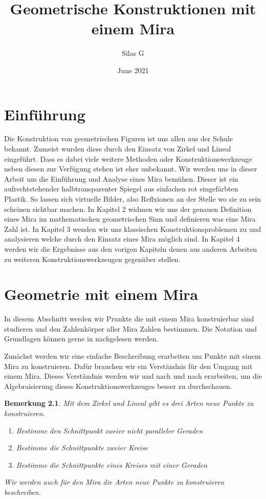 \documentclass{scrbook}
\newtheorem{remark}{Bemerkung}
\begin{document}
\frontmatter
\begin{titlepage}
    \title{Geometrische Konstruktionen mit einem Mira}
    \author{Silas G}
    \date{June 2021}
    \maketitle
\end{titlepage}
\tableofcontents

\mainmatter
\chapter{Einführung}

Die Konstruktion von geometrischen Figuren ist uns allen aus der Schule bekannt.
Zumeist wurden diese durch den Einsatz von Zirkel und Lineal eingeführt.
Dass es dabei viele weitere Methoden oder Konstruktionswerkzeuge neben diesen zur Verfügung stehen ist eher unbekannt.
Wir werden uns in dieser Arbeit um die Einführung und Analyse eines Mira bemühen. 
Dieser ist ein aufrechtstehender halbtransparenter Spiegel aus einfachen rot eingefärbten Plastik.
So lassen sich virtuelle Bilder, also Reflxionen an der Stelle wo sie zu sein scheinen sichtbar machen.
In Kapitel 2 widmen wir uns der genauen Definition eines Mira im mathematischen geometrischen Sinn und definieren was eine Mira Zahl ist.
In Kapitel 3 wenden wir uns klassischen Konstruktionsproblemen zu und analysieren welche durch den Einsatz eines Mira möglich sind.
In Kapitel 4 werden wir die Ergebnisse aus den vorigen Kapiteln denen aus anderen Arbeiten zu weiteren Konstruktionswerkzeugen gegenüber stellen.

\chapter{Geometrie mit einem Mira}

In diesem Abschnitt werden wir Prunkte die mit einem Mira konstruierbar sind studieren und den Zahlenkörper aller Mira Zahlen bestimmen.
Die Notation und Grundlagen können gerne in \cite{Vogel} nachgelesen werden.


Zunächst werden wir eine einfache Beschreibung erarbeiten um Punkte mit einem Mira zu konstruieren. Dafür brauchen wir ein Verständnis für den Umgang mit einem Mira. Dieses Verständnis werden wir und nach und nach erarbeiten, um die Algebraisierung dieses Konstruktionswerkzeuges besser zu durchschauen. 

\begin{remark}
    Mit dem Zirkel und Lineal gibt es drei Arten neue Punkte zu konstruieren.
    \begin{enumerate}
        \item Bestimme den Schnittpunkt zweier nicht paralleler Geraden
        \item Bestimme die Schnittpunkte zweier Kreise
        \item Bestimme die Schnittpunkte eines Kreises mit einer Geraden
    \end{enumerate}
    Wir werden auch für den Mira die Arten neue Punkte zu konstruieren beschreiben.
\end{remark}
\end{document}
